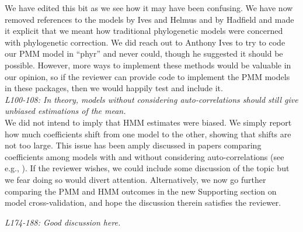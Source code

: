 \documentclass[11pt]{article}
\begin{document}
We have edited this bit as we see how it may have been confusing. We have now removed references to the models by Ives and Helmus and by Hadfield and made it explicit that we meant how traditional phylogenetic models were concerned with phylogenetic correction. We did reach out to Anthony Ives to try to code our PMM model in ``phyr'' and never could, though he suggested it should be possible. However, more ways to implement these methods would be valuable in our opinion, so if the reviewer can provide code to implement the PMM models in these packages, then we would happily test and include it.\\


\emph{L100-108: In theory, models without considering auto-correlations should still give unbiased estimations of the mean.}\\

We did not intend to imply that HMM estimates were biased. We simply report how much coefficients shift from one model to the other, showing that shifts are not too large. This issue has been amply discussed in papers comparing coefficients among models with and without considering auto-correlations (see e.g., \cite{mauricio2009coefficient}). If the reviewer wishes, we could include some discussion of the topic but we fear doing so would divert attention. Alternatively, we now go further comparing the PMM and HMM outcomes in the new Supporting section on model cross-validation, and hope the discussion therein satisfies the reviewer. 


\emph{L174-188: Good discussion here.}\\
\end{document}
